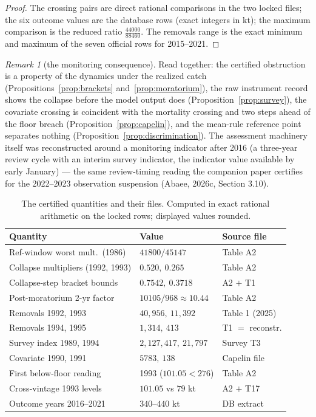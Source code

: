 \documentclass[10pt,twocolumn]{article}
\theoremstyle{plain}
\theoremstyle{remark}
\newtheorem{remark}[theorem]{Remark}
\begin{document}
\begin{proof}
The crossing pairs are direct rational comparisons in the two locked
files; the six outcome values are the database rows (exact integers in
kt); the maximum comparison is the reduced ratio
\(\tfrac{44000}{88460}\). The removals range is the exact minimum and
maximum of the seven official rows for 2015--2021.
\end{proof}

\begin{remark}[the monitoring consequence]\label{rem:monitoring}
Read together: the certified obstruction is a property of the
dynamics under the realized catch (Propositions~\ref{prop:brackets}
and~\ref{prop:moratorium}), the raw instrument record shows the
collapse before the model output does (Proposition~\ref{prop:survey}),
the covariate crossing is coincident with the mortality crossing and
two steps ahead of the floor breach (Proposition~\ref{prop:capelin}),
and the mean-rule reference point separates nothing
(Proposition~\ref{prop:discrimination}). The assessment machinery
itself was reconstructed around a monitoring indicator after 2016 (a
three-year review cycle with an interim survey indicator, the
indicator value available by early January) --- the same review-timing
reading the companion paper certifies for the 2022--2023 observation
suspension (Abaee, 2026c, Section 3.10).
\end{remark}

\begin{table}[t]
\centering
\scriptsize
\setlength{\tabcolsep}{2.8pt}
\caption{The certified quantities and their files. Computed in exact
rational arithmetic on the locked rows; displayed values rounded.}
\label{tab:summary}
\begin{tabular}{@{}l l l@{}}
\toprule
Quantity & Value & Source file \\
\midrule
Ref-window worst mult.\ (1986) & \(41800/45147\) & Table A2 \\
Collapse multipliers (1992, 1993) & \(0.520,\ 0.265\) & Table A2 \\
Collapse-step bracket bounds & \(0.7542,\ 0.3718\) & A2 $+$ T1 \\
Post-moratorium 2-yr factor & \(10105/968 \approx 10.44\) & Table A2 \\
Removals 1992, 1993 & \(40{,}956,\ 11{,}392\) & Table 1 (2025) \\
Removals 1994, 1995 & \(1{,}314,\ 413\) & T1 $=$ reconstr. \\
Survey index 1989, 1994 & \(2{,}127{,}417,\ 21{,}797\) & Survey T3 \\
Covariate 1990, 1991 & \(5783,\ 138\) & Capelin file \\
First below-floor reading & 1993 (\(101.05 < 276\)) & Table A2 \\
Cross-vintage 1993 levels & \(101.05\) vs \(79\) kt & A2 $+$ T17 \\
Outcome years 2016--2021 & \(340\)--\(440\) kt & DB extract \\
\bottomrule
\end{tabular}
\end{table}
\end{document}
